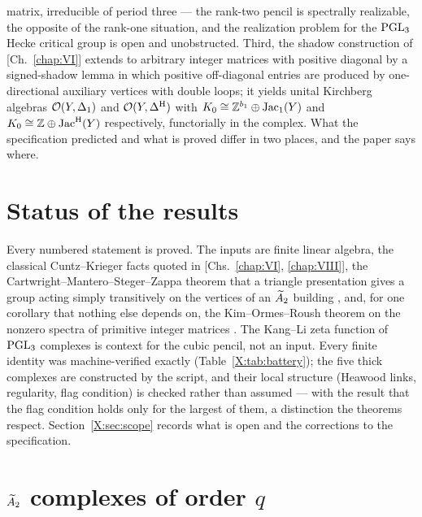 \begin{chapterabstract}
matrix, irreducible of period three --- the rank-two pencil is spectrally realizable, the
opposite of the rank-one situation, and the realization problem for the $\mathrm{PGL}_3$ Hecke
critical group is open and unobstructed. Third, the shadow construction of [Ch.~\ref{chap:VI}] extends to
arbitrary
integer matrices with positive diagonal by a signed-shadow lemma in which positive
off-diagonal entries are produced by one-directional auxiliary vertices with double loops;
it yields unital Kirchberg algebras $\mathcal{O}(Y,\Delta_1)$ and $\mathcal{O}(Y,\Delta^{\mathrm{H}})$ with
$K_0\cong\mathbb{Z}^{b_1}\oplus\operatorname{Jac}_1(Y)$ and $K_0\cong\mathbb{Z}\oplus\operatorname{Jac}^{\mathrm{H}}(Y)$ respectively, functorially
in the complex. What the specification predicted and what is proved differ in two places,
and the paper says where.
\end{chapterabstract}

\section*{Status of the results}

Every numbered statement is proved. The inputs are finite linear algebra, the classical
Cuntz--Krieger facts quoted in [Chs.~\ref{chap:VI}, \ref{chap:VIII}], the Cartwright--Mantero--Steger--Zappa theorem
that a triangle presentation gives a group acting simply transitively on the vertices of an
$\widetilde A_2$ building \cite{CMSZ}, and, for one corollary that nothing else depends on, the
Kim--Ormes--Roush theorem on the nonzero spectra of primitive integer matrices \cite{KOR}.
The Kang--Li zeta function of $\mathrm{PGL}_3$ complexes \cite{KL} is context for the cubic pencil,
not an input. Every finite identity was machine-verified exactly (Table~\ref{X:tab:battery});
the five thick complexes are constructed by the script, and their local structure (Heawood
links, regularity, flag condition) is checked rather than assumed --- with the result that
the flag condition holds only for the largest of them, a distinction the theorems respect. Section~\ref{X:sec:scope}
records what is open and the corrections to the specification.

\section{\texorpdfstring{$\widetilde A_2$ complexes of order $q$}{A2 complexes of order q}}\label{X:sec:complexes}

